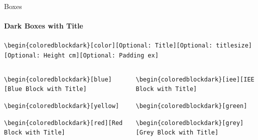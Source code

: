 \documentclass[aspectratio=169]{beamer}
\begin{document}
\begin{frame}{Boxes}
    \framesubtitle{Dark Boxes with Title}

    \begin{coloredblock}[grey]
        \footnotesize\centering\texttt{\textbackslash begin\{coloredblockdark\}[color][Optional:~Title][Optional:~titlesize][Optional:~Height cm][Optional:~Padding ex]}
    \end{coloredblock}

    \vspace{-1.1cm}
    \begin{columns}
        \begin{column}{0.49\textwidth}
    
            \begin{coloredblockdark}
                \footnotesize\texttt{\textbackslash begin\{coloredblockdark\}[blue][Blue Block with Title]}\strut
            \end{coloredblockdark}
    
            \begin{coloredblockdark}
                \footnotesize\texttt{\textbackslash begin\{coloredblockdark\}[yellow]}\strut
            \end{coloredblockdark}
    
            \begin{coloredblockdark}
                \footnotesize\texttt{\textbackslash begin\{coloredblockdark\}[red][Red Block with Title]}\strut
            \end{coloredblockdark}
        
        \end{column}
        \begin{column}{0.49\textwidth}
    
            \begin{coloredblockdark}
                \footnotesize\texttt{\textbackslash begin\{coloredblockdark\}[iee][IEE Block with Title]}\strut
            \end{coloredblockdark}
    
            \begin{coloredblockdark}
                \footnotesize\texttt{\textbackslash begin\{coloredblockdark\}[green]}\strut
            \end{coloredblockdark}
    
            \begin{coloredblockdark}
                \footnotesize\texttt{\textbackslash begin\{coloredblockdark\}[grey][Grey Block with Title]}\strut
            \end{coloredblockdark}
        
        \end{column}
    \end{columns}
\end{frame}
\end{document}
